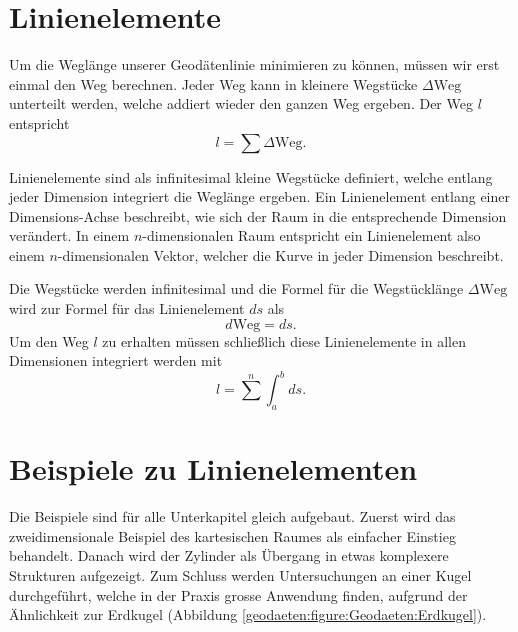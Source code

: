 %
%
%
%
\section{Linienelemente\label{geodaeten:section:Linienelemente}}

Um die Weglänge unserer Geodätenlinie minimieren zu können, müssen wir erst einmal den Weg berechnen.
Jeder Weg kann in kleinere Wegstücke $\Delta \text{Weg}$ unterteilt werden, welche addiert wieder den ganzen Weg ergeben.
Der Weg $l$ entspricht 
\begin{equation}
	l = \sum \Delta \text{Weg} .
\end{equation}

Linienelemente sind als infinitesimal kleine Wegstücke definiert, welche entlang jeder Dimension integriert die Weglänge ergeben.
Ein Linienelement entlang einer Dimensions-Achse beschreibt, wie sich der Raum in die entsprechende Dimension verändert.
In einem $n$-dimensionalen Raum entspricht ein Linienelement also einem $n$-dimensionalen Vektor, welcher die Kurve in jeder Dimension beschreibt.

Die Wegstücke werden infinitesimal und die Formel für die Wegstücklänge $\Delta \text{Weg}$ wird zur Formel für das Linienelement $ds$  als
\begin{equation}	
	d\text{Weg} = ds .
	\label{geodaeten:equation:Linienelemente:equation1}
\end{equation}
Um den Weg $l$ zu erhalten müssen schließlich diese Linienelemente in allen Dimensionen integriert werden mit
\begin{equation}
	l = 
	\sum^{n} \int_a^b ds .
	\label{geodaeten:equation:Linienelemente:equation2}
\end{equation}

\section{Beispiele zu Linienelementen\label{geodaeten:section:Linienelemente:Beispiele}}
Die Beispiele sind für alle Unterkapitel gleich aufgebaut.
Zuerst wird das zweidimensionale Beispiel des kartesischen Raumes als einfacher Einstieg behandelt.
Danach wird der Zylinder als Übergang in etwas komplexere Strukturen aufgezeigt.
Zum Schluss werden Untersuchungen an einer Kugel durchgeführt, welche in der Praxis grosse Anwendung finden, aufgrund der Ähnlichkeit zur Erdkugel (Abbildung \ref{geodaeten:figure:Geodaeten:Erdkugel}).

	
	
	

